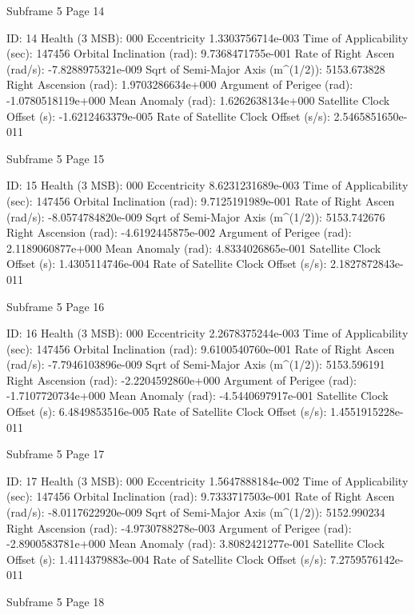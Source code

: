  Subframe  5 Page 14

 ID:				     14
 Health (3 MSB):		     000
 Eccentricity			     1.3303756714e-003
 Time of Applicability (sec):	       147456
 Orbital Inclination (rad):	     9.7368471755e-001
 Rate of Right Ascen (rad/s):	     -7.8288975321e-009
 Sqrt of Semi-Major Axis (m^(1/2)):  5153.673828
 Right Ascension (rad): 	     1.9703286634e+000
 Argument of Perigee (rad):	     -1.0780518119e+000
 Mean Anomaly (rad):		     1.6262638134e+000
 Satellite Clock Offset (s):	     -1.6212463379e-005
 Rate of Satellite Clock Offset (s/s): 2.5465851650e-011

 Subframe  5 Page 15

 ID:				     15
 Health (3 MSB):		     000
 Eccentricity			     8.6231231689e-003
 Time of Applicability (sec):	       147456
 Orbital Inclination (rad):	     9.7125191989e-001
 Rate of Right Ascen (rad/s):	     -8.0574784820e-009
 Sqrt of Semi-Major Axis (m^(1/2)):  5153.742676
 Right Ascension (rad): 	     -4.6192445875e-002
 Argument of Perigee (rad):	     2.1189060877e+000
 Mean Anomaly (rad):		     4.8334026865e-001
 Satellite Clock Offset (s):	     1.4305114746e-004
 Rate of Satellite Clock Offset (s/s): 2.1827872843e-011

 Subframe  5 Page 16

 ID:				     16
 Health (3 MSB):		     000
 Eccentricity			     2.2678375244e-003
 Time of Applicability (sec):	       147456
 Orbital Inclination (rad):	     9.6100540760e-001
 Rate of Right Ascen (rad/s):	     -7.7946103896e-009
 Sqrt of Semi-Major Axis (m^(1/2)):  5153.596191
 Right Ascension (rad): 	     -2.2204592860e+000
 Argument of Perigee (rad):	     -1.7107720734e+000
 Mean Anomaly (rad):		     -4.5440697917e-001
 Satellite Clock Offset (s):	     6.4849853516e-005
 Rate of Satellite Clock Offset (s/s): 1.4551915228e-011

 Subframe  5 Page 17

 ID:				     17
 Health (3 MSB):		     000
 Eccentricity			     1.5647888184e-002
 Time of Applicability (sec):	       147456
 Orbital Inclination (rad):	     9.7333717503e-001
 Rate of Right Ascen (rad/s):	     -8.0117622920e-009
 Sqrt of Semi-Major Axis (m^(1/2)):  5152.990234
 Right Ascension (rad): 	     -4.9730788278e-003
 Argument of Perigee (rad):	     -2.8900583781e+000
 Mean Anomaly (rad):		     3.8082421277e-001
 Satellite Clock Offset (s):	     1.4114379883e-004
 Rate of Satellite Clock Offset (s/s): 7.2759576142e-011

 Subframe  5 Page 18


